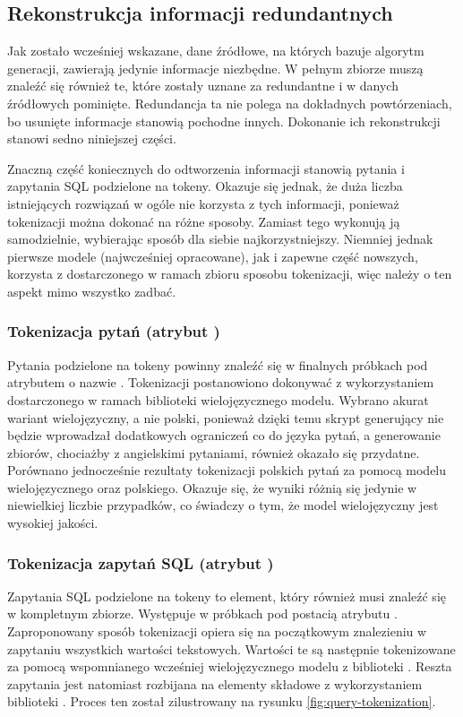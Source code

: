 \subsection{Rekonstrukcja informacji redundantnych}
Jak zostało wcześniej wskazane, dane źródłowe, na których bazuje algorytm generacji, zawierają jedynie informacje niezbędne. W pełnym zbiorze muszą znaleźć się również te, które zostały uznane za redundantne i w danych źródłowych pominięte. Redundancja ta nie polega na dokładnych powtórzeniach, bo usunięte informacje stanowią pochodne innych. Dokonanie ich rekonstrukcji stanowi sedno niniejszej części.

Znaczną część koniecznych do odtworzenia informacji stanowią pytania i zapytania SQL podzielone na tokeny. Okazuje się jednak, że duża liczba istniejących rozwiązań w ogóle nie korzysta z tych informacji, ponieważ tokenizacji można dokonać na różne sposoby. Zamiast tego wykonują ją samodzielnie, wybierając sposób dla siebie najkorzystniejszy. Niemniej jednak pierwsze modele (najwcześniej opracowane), jak i zapewne część nowszych, korzysta z dostarczonego w ramach zbioru sposobu tokenizacji, więc należy o ten aspekt mimo wszystko zadbać.

\subsubsection{Tokenizacja pytań (atrybut )}
Pytania podzielone na tokeny powinny znaleźć się w finalnych próbkach pod atrybutem o nazwie . Tokenizacji postanowiono dokonywać z wykorzystaniem dostarczonego w ramach biblioteki  wielojęzycznego modelu. Wybrano akurat wariant wielojęzyczny, a nie polski, ponieważ dzięki temu skrypt generujący nie będzie wprowadzał dodatkowych ograniczeń co do języka pytań, a generowanie zbiorów, chociażby z angielskimi pytaniami, również okazało się przydatne. Porównano jednocześnie rezultaty tokenizacji polskich pytań za pomocą modelu wielojęzycznego oraz polskiego. Okazuje się, że wyniki różnią się jedynie w niewielkiej liczbie przypadków, co świadczy o tym, że model wielojęzyczny jest wysokiej jakości.

\subsubsection{Tokenizacja zapytań SQL (atrybut )}
Zapytania SQL podzielone na tokeny to element, który również musi znaleźć się w kompletnym zbiorze. Występuje w próbkach pod postacią atrybutu . Zaproponowany sposób tokenizacji opiera się na początkowym znalezieniu w zapytaniu wszystkich wartości tekstowych. Wartości te są następnie tokenizowane za pomocą wspomnianego wcześniej wielojęzycznego modelu z biblioteki . Reszta zapytania jest natomiast rozbijana na elementy składowe z wykorzystaniem biblioteki . Proces ten został zilustrowany na rysunku \ref{fig:query-tokenization}.

